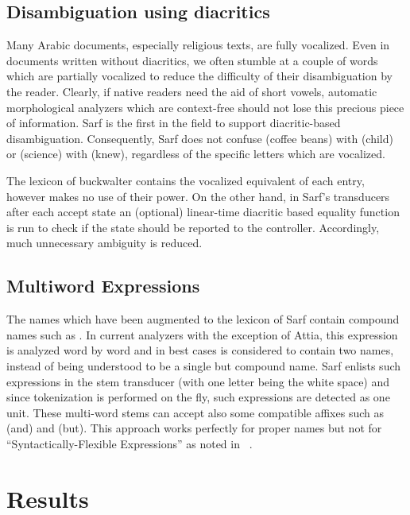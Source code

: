 \documentclass[11pt]{article}
\newcommand{\noVocRL}[1]{\transtrue\novocalize\RL{#1}\vocalize}
\begin{document}
\subsection{Disambiguation using diacritics}
\label{sec:diacritics}

Many Arabic documents, especially religious texts, are fully vocalized.
Even in documents written without diacritics, we often stumble at a couple of words which are partially vocalized
to reduce the difficulty of their disambiguation by the reader. Clearly, if native readers
need the aid of short vowels, automatic morphological analyzers which are context-free should not lose this precious piece of information.
Sarf is the first in the field to support diacritic-based disambiguation. Consequently, Sarf does not confuse  (coffee beans) with  (child)
or  (science) with  (knew), regardless of the specific letters which are vocalized.

The lexicon of buckwalter contains the vocalized equivalent of each entry, however makes no use of their power. 
On the other hand, in Sarf's transducers after each accept state an (optional) linear-time diacritic based equality function is run
to check if the state should be reported to the controller. Accordingly, much unnecessary ambiguity is reduced.

\subsection{Multiword Expressions}
\label{sec:MWE}

The names which have been augmented to the lexicon of Sarf contain compound names such as 
\noVocRL{`bid alkarym}. 
In current analyzers with the exception of Attia, this expression is analyzed word by word and in best cases is 
considered to contain two names, instead of being understood to be a single but compound name.
Sarf enlists such expressions in the stem transducer (with one letter being the white space) and since tokenization
is performed on the fly, such expressions are detected as one unit. These multi-word stems
can accept also some compatible affixes such as  (and) and  (but).
This approach works perfectly for proper names but not for ``Syntactically-Flexible Expressions'' as noted
in ~\cite{MWE}. %

\section{Results}
\label{sec:results}
\end{document}
